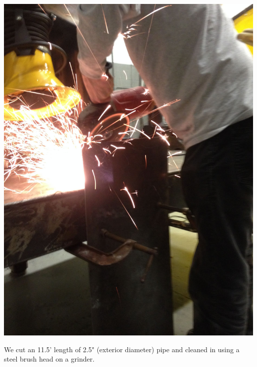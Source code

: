 \documentclass[11pt]{article} %
\begin{document}
\begin{center}
\includegraphics[scale=0.12]{roofmount/02.jpeg}
\end{center}


We cut an 11.5' length of 2.5" (exterior diameter) pipe and cleaned in using a steel brush head on a grinder.
\end{document}
